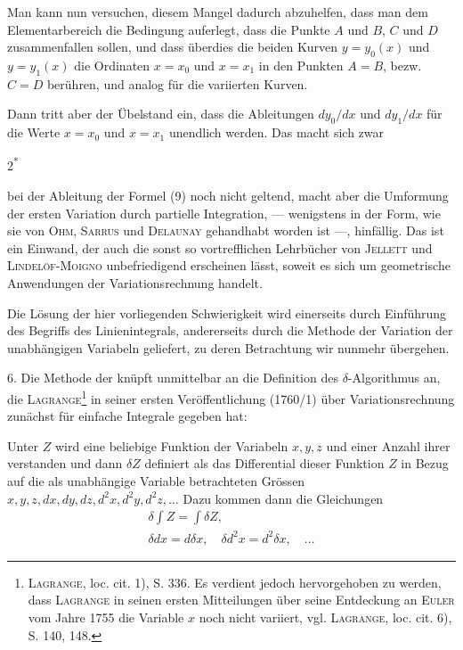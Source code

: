 Man kann nun versuchen, diesem Mangel dadurch abzuhelfen, dass man
dem Elementarbereich die Bedingung auferlegt, dass die Punkte $A$ und $B$, $C$
und $D$ zusammenfallen sollen, und dass überdies die beiden Kurven $y=y_0(x)$
und $y=y_1(x)$ die Ordinaten $x=x_0$ und $x=x_1$ in den Punkten $A=B$, bezw.
$C=D$ berühren, und analog für die variierten Kurven.

Dann tritt aber der Übelstand ein, dass die Ableitungen $dy_0/dx$ und $dy_1/dx$
für die Werte $x=x_0$ und $x=x_1$ unendlich werden. Das macht sich zwar
\par\smallskip\noindent\hfill{\small 2\textsuperscript{*}}\par
\clearpage{}
\noindent bei der Ableitung der Formel (9) noch nicht geltend, macht aber die Umformung
der ersten Variation durch partielle Integration, — wenigstens in
der Form, wie sie von \textsc{Ohm}, \textsc{Sarrus} und \textsc{Delaunay} gehandhabt worden
ist —, hinfällig. Das ist ein Einwand, der auch die sonst so vortrefflichen
Lehrbücher von \textsc{Jellett} und \textsc{Lindelöf-Moigno} unbefriedigend erscheinen lässt,
soweit es sich um geometrische Anwendungen der Variationsrechnung handelt.

Die Lösung der hier vorliegenden Schwierigkeit wird einerseits durch
Einführung des Begriffs des Linienintegrals, andererseits durch die Methode
der Variation der unabhängigen Variabeln geliefert, zu deren Betrachtung
wir nunmehr übergehen.

6. Die Methode der  knüpft
unmittelbar an die Definition des $\delta$-Algorithmus an, die \textsc{Lagrange}\footnote{\textsc{Lagrange}, loc. cit. 1), S. 336. Es verdient jedoch hervorgehoben zu werden, dass \textsc{Lagrange} in seinen ersten  Mitteilungen über seine Entdeckung an \textsc{Euler} vom Jahre 1755 die Variable $x$ noch nicht variiert, vgl. \textsc{Lagrange}, loc. cit. 6), S. 140, 148.} in seiner
ersten Veröffentlichung (1760/1) über Variationsrechnung zunächst für einfache
Integrale gegeben hat:

Unter $Z$ wird eine beliebige Funktion der Variabeln $x,y,z$ und einer
Anzahl ihrer  verstanden und dann $\delta Z$ definiert als das Differential
dieser Funktion $Z$ in Bezug auf die als unabhängige Variable betrachteten
Grössen $x,y,z,dx,dy,dz,d^2x,d^2y,d^2z,\ldots$ Dazu kommen dann
die Gleichungen
\[
\begin{gathered}
\delta\!\int Z=\int\delta Z,\\
\delta dx=d\delta x,\quad\delta d^2x=d^2\delta x,\quad\ldots
\end{gathered}
\]

